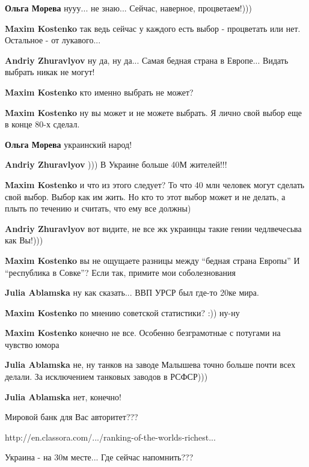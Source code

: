 \begin{itemize}
\begin{itemize}
\textbf{Ольга Морева} нууу... не знаю...
Сейчас, наверное, процветаем!)))

\begin{itemize} %
\textbf{Maxim Kostenko} так ведь сейчас у каждого есть выбор - процветать или нет. Остальное - от лукавого...

\textbf{Andriy Zhuravlyov} ну да, ну да...
Самая бедная страна в Европе...
Видать выбрать никак не могут!

\textbf{Maxim Kostenko} кто именно выбрать не может?

\textbf{Maxim Kostenko} ну вы может и не можете выбрать. Я лично свой выбор еще в конце 80-х сделал.

\textbf{Ольга Морева} украинский народ!

\textbf{Andriy Zhuravlyov} )))
В Украине больше 40М жителей!!!

\textbf{Maxim Kostenko} и что из этого следует? То что 40 млн человек могут сделать свой выбор. Выбор как им жить. Но кто то этот выбор может и не делать, а плыть по течению и считать, что ему все должны)

\textbf{Andriy Zhuravlyov} вот видите, не все жк украинцы такие гении чедлвечесьва как Вы!)))

\textbf{Maxim Kostenko} вы не ощущаете разницы между \enquote{бедная страна Европы} И \enquote{республика в Совке}? Если так, примите мои соболезнования

\textbf{Julia Ablamska} ну как сказать...
ВВП УРСР был где-то 20ке мира.

\textbf{Maxim Kostenko} по мнению советской статистики? :)) ну-ну

\textbf{Maxim Kostenko} конечно не все. Особенно безграмотные с потугами на чувство юмора

\textbf{Julia Ablamska} не, ну танков на заводе Малышева точно больше почти всех делали. За исключением танковых заводов в РСФСР)))

\textbf{Julia Ablamska} нет, конечно!

Мировой банк для Вас авторитет???

http://en.classora.com/.../ranking-of-the-worlds-richest...

Украина - на 30м месте...
Где сейчас напомнить???


\end{itemize}
\end{itemize}
\end{itemize}
